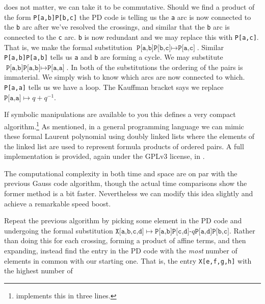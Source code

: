         does not matter, we can take it to be commutative. Should we find a
        product of the form \texttt{P[a,b]P[b,c]} the PD code is telling us
        the \texttt{a} arc is now connected to the \texttt{b} arc after we've
        resolved the crossings, and similar that the \texttt{b} arc is
        connected to the \texttt{c} arc. \texttt{b} is now redundant and we
        may replace this with \texttt{P[a,c]}. That is, we make the formal
        substitution $\texttt{P[a,b]P[b,c]}\mapsto\texttt{P[a,c]}$. Similar
        \texttt{P[a,b]P[a,b]} tells us \texttt{a} and \texttt{b} are forming a
        cycle. We may substitute $\texttt{P[a,b]P[a,b]}\mapsto\texttt{P[a,a]}$.
        In both of the substitutions the ordering of the pairs is immaterial.
        We simply wish to know which arcs are now connected to which.
        \texttt{P[a,a]} tells us we have a loop. The Kauffman bracket says
        we replace $\texttt{P[a,a]}\mapsto{q}+q^{-1}$.
        \par\hfill\par
        If symbolic manipulations are available to you this defines a very
        compact algorithm.\footnote{%
            \cite{KatlasJones} implements this in three lines.
        }
        As mentioned, in a general programming language we can mimic these
        formal Laurent polynomial using doubly linked lists where the elements
        of the linked list are used to represent formula products of ordered
        pairs. A full implementation is provided, again under the GPLv3
        license, in \cite{MaguireJones}.
        \par\hfill\par
        The computational complexity in both time and space are on par with the
        previous Gauss code algorithm, though the actual time comparisons show
        the former method is a bit faster. Nevertheless we can modify this
        idea slightly and achieve a remarkable speed boost.
        \par\hfill\par
        Repeat the previous algorithm by picking some element in the PD code
        and undergoing the formal substitution
        $\texttt{X[a,b,c,d]}\mapsto\texttt{P[a,b]P[c,d]-$q$P[a,d]P[b,c]}$.
        Rather than doing this for each crossing,
        forming a product of affine terms,
        and then expanding, instead find the entry in the PD code with the
        \textit{most} number of elements in common with our starting one.
        That is, the entry \texttt{X[e,f,g,h]} with the highest number of
